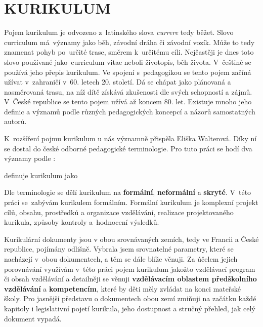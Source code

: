 \chapter{KURIKULUM}
\label{kurikulum}
Pojem kurikulum je odvozeno z latinského slova \textit{currere} tedy běžet.  Slovo curriculum má významy jako běh, závodní dráha či závodní vozík. Může to tedy znamenat pohyb po určité trase, směrem k určitému cíli. Nejčastěji je dnes toto slovo používané jako curriculum vitae neboli životopis, běh života. V češtině se používá jeho přepis kurikulum. 
Ve spojení s pedagogikou se tento pojem začíná užívat v zahraničí v 60. letech 20. století. Dá se chápat jako plánovaná a nasměrovaná trasu, na níž dítě získává zkušenosti dle svých schopností a zájmů. V České republice se tento pojem užívá až koncem 80. let. Existuje mnoho jeho definic a významů podle různých pedagogických koncepcí a názorů samostatných autorů.

K rozšíření pojmu kurikulum u nás významně přispěla Eliška Walterová. Díky ní se dostal do české odborné pedagogické terminologie. Pro tuto práci se hodí dva významy podle \citet[s.~15]{Walterova}:



\citet{Prucha} definuje kurikulum jako 

Dle terminologie se dělí kurikulum na \textbf{formální}, \textbf{neformální} a \textbf{skryté}. V této práci se zabývám kurikulem formálním. Formální kurikulum je komplexní projekt cílů, obsahu, prostředků a organizace vzdělávání, realizace projektovaného kurikula, způsoby kontroly a hodnocení výsledků.

Kurikulární dokumenty jsou v obou srovnávaných zemích, tedy ve Francii a České republice, pojímány odlišně. %
  Vybrala jsem srovnatelné parametry, které se nacházejí v obou dokumentech, a těm se dále blíže věnuji. Za účelem jejich porovnávání využívám v této práci pojem kurikulum jakožto vzdělávací program či obsah vzdělávání a detailněji se věnuji \textbf{vzdělávacím oblastem předškolního vzdělávání} a \textbf{kompetencím}, které by děti měly zvládat na konci mateřské školy. Pro jasnější představu o dokumentech obou zemí zmiňuji na začátku každé kapitoly i legislativní pojetí kurikula, jeho dostupnost a stručný přehled, jak celý dokument vypadá. 

